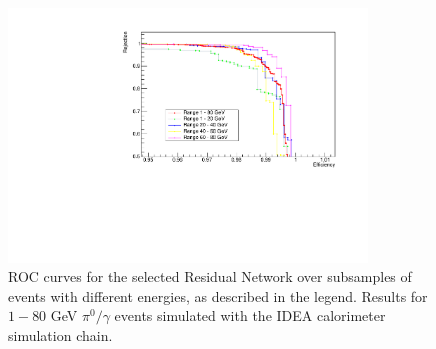 \begin{figure}
	\centering
	\includegraphics[width=0.85\textwidth]{IMG/Cap6/ROC_Res_sub_zoom.pdf}
	\caption{ROC curves for the selected Residual Network over subsamples of events with different energies, as described in the legend. Results for $1-80$ GeV $\pi^0/\gamma$ events simulated with the IDEA calorimeter simulation chain.}
	\label{fig:ROC_Res_sub}
\end{figure}
